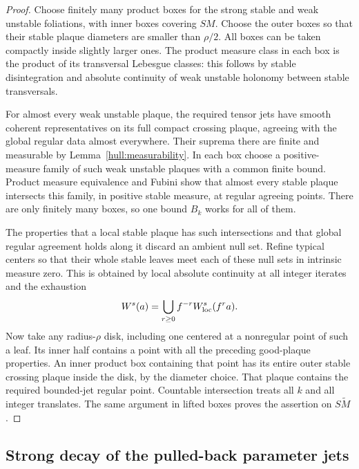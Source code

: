 \begin{proof}
Choose finitely many product boxes for the strong stable and weak
unstable foliations, with inner boxes covering $SM$. Choose the
outer boxes so that their stable plaque diameters are smaller than
$\rho/2$. All boxes can be taken compactly inside slightly larger
ones. The product measure class in each box is the product of its
transversal Lebesgue classes: this follows by stable disintegration
and absolute continuity of weak unstable holonomy between stable
transversals.

For almost every weak unstable plaque, the required tensor jets have
smooth coherent representatives on its full compact crossing
plaque, agreeing with the global regular data almost everywhere.
Their suprema there are finite and measurable by
Lemma~\ref{hull:measurability}. In each box choose a positive-measure
family of such weak unstable plaques with a common finite bound.
Product measure equivalence and Fubini show that almost every stable
plaque intersects this family, in positive stable measure, at
regular agreeing points. There are only finitely many boxes, so one
bound $B_k$ works for all of them.

The properties that a local stable plaque has such intersections
and that global regular agreement holds along it discard an ambient
null set. Refine typical centers so that their whole stable leaves
meet each of these null sets in intrinsic measure zero. This is
obtained by local absolute continuity at all integer iterates and
the exhaustion
\[
 W^s(a)=\bigcup_{r\ge0} f^{-r}W^s_{\mathrm{loc}}(f^r a).
\]
Now take any radius-$\rho$ disk, including one centered at a
nonregular point of such a leaf. Its inner half contains a point
with all the preceding good-plaque properties. An inner product box
containing that point has its entire outer stable crossing plaque
inside the disk, by the diameter choice. That plaque contains the
required bounded-jet regular point. Countable intersection treats
all $k$ and all integer translates. The same argument in lifted
boxes proves the assertion on $S\widetilde M$.
\end{proof}

\subsection{Strong decay of the pulled-back parameter jets}

